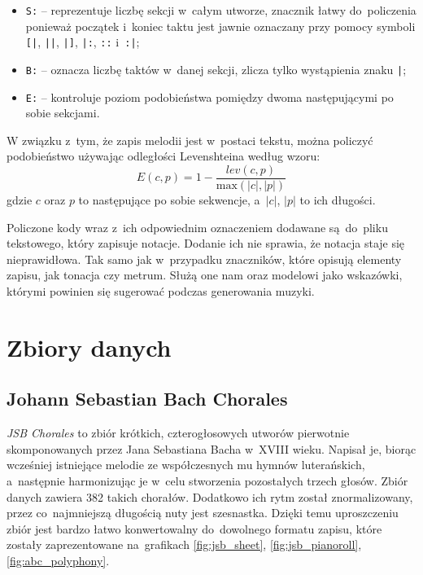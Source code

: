 \documentclass[data-science]{agh-wi} %
\begin{document}
\begin{itemize}
    \item \texttt{S:} -- reprezentuje liczbę sekcji w~całym utworze, znacznik łatwy do~policzenia ponieważ początek i~koniec taktu jest jawnie oznaczany przy pomocy symboli \texttt{[|}, \texttt{||}, \texttt{|]}, \texttt{|:}, \texttt{::} i~\texttt{:|};
    \item \texttt{B:} -- oznacza liczbę taktów w~danej sekcji, zlicza tylko wystąpienia znaku \texttt{|};
    \item \texttt{E:} -- kontroluje poziom podobieństwa pomiędzy dwoma następującymi po sobie sekcjami.
\end{itemize}

W związku z~tym, że zapis melodii jest w~postaci tekstu, można policzyć podobieństwo używając odległości Levenshteina według wzoru:
\begin{equation}
    E(c,p) = 1 - \dfrac{lev(c, p)}{\text{max}(|c|, |p|)}
\end{equation} %
gdzie $c$ oraz $p$ to następujące po sobie sekwencje, a~$|c|$, $|p|$ to ich długości.

Policzone kody wraz z~ich odpowiednim oznaczeniem dodawane są~do~pliku tekstowego, który zapisuje notacje. Dodanie ich nie sprawia, że notacja staje się nieprawidłowa. Tak samo jak w~przypadku znaczników, które opisują elementy zapisu, jak tonacja czy metrum. Służą one nam oraz modelowi jako wskazówki, którymi powinien się sugerować podczas generowania muzyki.

\section{Zbiory danych}

\subsection{Johann Sebastian Bach Chorales}
\textit{JSB Chorales} \cite{bachchorales} to zbiór krótkich, czterogłosowych utworów pierwotnie skomponowanych przez Jana Sebastiana Bacha w~XVIII wieku. Napisał je, biorąc wcześniej istniejące melodie ze współczesnych mu hymnów luterańskich, a~następnie harmonizując je w~celu stworzenia pozostałych trzech głosów. Zbiór danych zawiera 382 takich chorałów. Dodatkowo ich rytm został znormalizowany, przez co~najmniejszą długością nuty jest szesnastka. Dzięki temu uproszczeniu zbiór jest bardzo łatwo konwertowalny do~dowolnego formatu zapisu, które zostały zaprezentowane na~grafikach \ref*{fig:jsb_sheet}, \ref*{fig:jsb_pianoroll}, \ref*{fig:abc_polyphony}.
\end{document}
